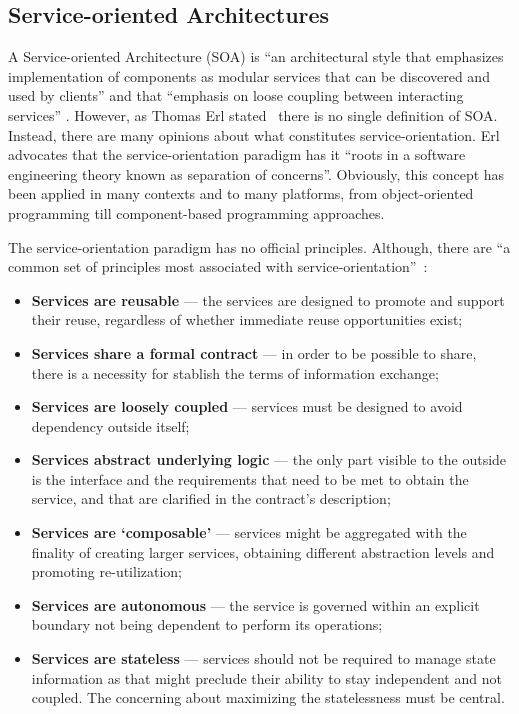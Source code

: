 \subsection{Service-oriented Architectures} \label{sec:soa}


A Service-oriented Architecture (SOA) is ``an architectural style that emphasizes implementation of components as modular services that can be discovered and used by clients'' and that ``emphasis on loose coupling between interacting services'' \citep{Srinivasan2005}. However, as Thomas Erl stated~\citep{Erl2005} there is no single definition of SOA. Instead, there are many opinions about what constitutes service-orientation. Erl advocates that the service-orientation paradigm has it ``roots in a software engineering theory known as separation of concerns''. Obviously, this concept has been applied in many contexts and to many platforms, from object-oriented programming till component-based programming approaches.

The service-orientation paradigm has no official principles. Although, there are ``a common set of principles most associated with service-orientation''~\citep{Erl2005}:
\begin{itemize}
\item \textbf{Services are reusable} --- the services are designed to promote and support their reuse, regardless of whether immediate reuse opportunities exist;
\item \textbf{Services share a formal contract} --- in order to be possible to share, there is a necessity for stablish the terms of information exchange;
\item \textbf{Services are loosely coupled} --- services must be designed to avoid dependency outside itself;
\item \textbf{Services abstract underlying logic} --- the only part visible to the outside is the interface and the requirements that need to be met to obtain the service, and that are clarified in the contract's description;
\item \textbf{Services are `composable'} --- services might be aggregated with the finality of creating larger services, obtaining different abstraction levels and promoting re-utilization;
\item \textbf{Services are autonomous} --- the service is governed within an explicit boundary not being dependent to perform its operations;
\item \textbf{Services are stateless} --- services should not be required to manage state information as that might preclude their ability to stay independent and not coupled. The concerning about maximizing the statelessness must be central.
\end{itemize}

